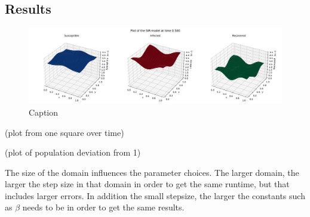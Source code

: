 \subsection{Results}
\begin{figure}
    \centering
    \includegraphics[width=\textwidth]{report/Images/plots/plot-i_t=5000.pdf}
    \caption{Caption}
    \label{fig:enter-label}
\end{figure}

(plot from one square over time)

(plot of population deviation from 1)

The size of the domain influences the parameter choices. The larger domain, the larger the step size in that domain in order to get the same runtime, but that includes larger errors.
In addition the small stepsize, the larger the constants such as $\beta$ needs to be in order to get the same results.


